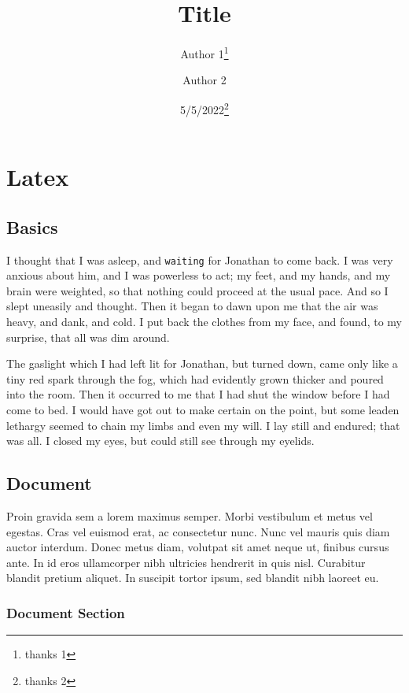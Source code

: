 \documentclass[12pt,a4paper]{book}
\title{Title}
\author{Author 1\thanks{thanks 1} \and Author 2}
\date{5/5/2022\thanks{thanks 2}}
\begin{document}
\maketitle

\part{Latex}

\chapter{Basics}



I thought that I was asleep, and \texttt{waiting} for Jonathan to come back.
I was very anxious about him, and I was powerless to act; my feet,
and my hands, and my brain were weighted, so that nothing could proceed
at the usual pace. And so I slept uneasily and thought. Then it began to
dawn upon me that the air was heavy, and dank, and cold. I put back the
clothes from my face, and found, to my surprise, that all was dim around.

The gaslight which I had left lit for Jonathan, but turned down, came only
like a tiny red spark through the fog, which had evidently grown thicker and
poured into the room. Then it occurred to me that I had shut the window before
I had come to bed. I would have got out to make certain on the point, but some
leaden lethargy seemed to chain my limbs and even my will. I lay still and endured;
that was all. I closed my eyes, but could still see through my eyelids.

\chapter{Document}

Proin gravida sem a lorem maximus semper. Morbi vestibulum et metus vel egestas.
Cras vel euismod erat, ac consectetur nunc. Nunc vel mauris quis diam auctor interdum.
Donec metus diam, volutpat sit amet neque ut, finibus cursus ante.
In id eros ullamcorper nibh ultricies hendrerit in quis nisl.
Curabitur blandit pretium aliquet. In suscipit tortor ipsum, sed blandit nibh laoreet eu.

\section{Document Section}
\end{document}
